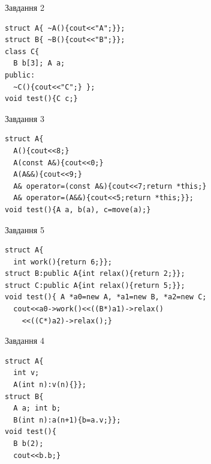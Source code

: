 \documentclass[12pt, ukrainian]{article}
\begin{document}
{{{{{{{{{{{{{{{{{\begin{minipage}[t]{11cm}
               
{\begin{center}Завдання {2}\end{center}}
\vspace{-6mm}

\begin{verbatim}
struct A{ ~A(){cout<<"A";}};
struct B{ ~B(){cout<<"B";}};
class C{
  B b[3]; A a;
public:
  ~C(){cout<<"C";} };
void test(){C c;}
\end{verbatim}            


               
{\begin{center}Завдання {3}\end{center}}
\vspace{-6mm}

\begin{verbatim}
struct A{
  A(){cout<<8;}
  A(const A&){cout<<0;}
  A(A&&){cout<<9;}
  A& operator=(const A&){cout<<7;return *this;}
  A& operator=(A&&){cout<<5;return *this;}};
void test(){A a, b(a), c=move(a);}
\end{verbatim}            


               
{\begin{center}Завдання {5}\end{center}}
\vspace{-6mm}

\begin{verbatim}
struct A{
  int work(){return 6;}};
struct B:public A{int relax(){return 2;}};
struct C:public A{int relax(){return 5;}};
void test(){ A *a0=new A, *a1=new B, *a2=new C;
  cout<<a0->work()<<((B*)a1)->relax()
    <<((C*)a2)->relax();}
\end{verbatim}            


\end{minipage}
\vline \hspace{8mm}
\begin{minipage}[t]{7cm}
               
{\begin{center}Завдання {4}\end{center}}
\vspace{-6mm}

\begin{verbatim}
struct A{
  int v;
  A(int n):v(n){}};
struct B{
  A a; int b;
  B(int n):a(n+1){b=a.v;}};
void test(){
  B b(2);
  cout<<b.b;}
\end{verbatim}            



\end{minipage}}}}}}}}}}}}}}}}}}
\end{document}

